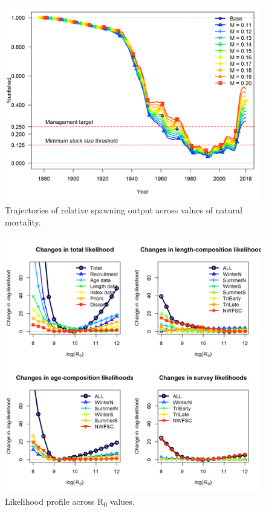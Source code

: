 \documentclass[12pt,]{article}
\begin{document}
\FloatBarrier

\begin{figure}
\centering
\includegraphics{Figures/m_trajectories_depl.png}
\caption{Trajectories of relative spawning output across values of
natural mortality. \label{fig:m_depl_trajectory}}
\end{figure}

\FloatBarrier

\begin{figure}
\centering
\includegraphics{Figures/piner_panel_R0.png}
\caption{Likelihood profile across R\textsubscript{0} values.
\label{fig:piner_R0}}
\end{figure}
\end{document}
